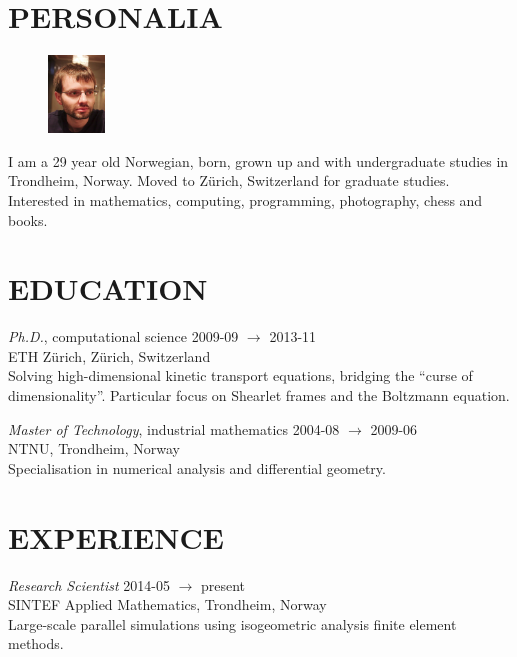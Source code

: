 \documentclass[line,margin]{res}
\newcommand{\zh}{Z\"{u}rich}
\begin{document}
\address{Høgreina 394, NO-7079 Flatåsen}
\address{+41 41 44 98 89, evfonn@gmail.com}


\begin{resume}

\section{PERSONALIA}

\begin{figure}
  \vspace{-0.6cm}
  \includegraphics[width=1.5cm]{photo.png}
\end{figure}

I am a 29 year old Norwegian, born, grown up and with undergraduate studies in Trondheim,
Norway. Moved to Zürich, Switzerland for graduate studies. Interested in mathematics, computing,
programming, photography, chess and books.


\section{EDUCATION} 

{\em Ph.D.}, computational science \hfill 2009-09 $\to$ 2013-11 \\
ETH \zh, \zh, Switzerland \\
Solving high-dimensional kinetic transport equations, bridging the ``curse of
dimensionality''. Particular focus on Shearlet frames and the Boltzmann equation.

{\em Master of Technology}, industrial mathematics \hfill 2004-08 $\to$ 2009-06 \\
NTNU, Trondheim, Norway \\
Specialisation in numerical analysis and differential geometry.


\section{EXPERIENCE}

{\em Research Scientist} \hfill 2014-05 $\to$ present \\
SINTEF Applied Mathematics, Trondheim, Norway \\
Large-scale parallel simulations using isogeometric analysis finite element methods.


\end{resume}
\end{document}
